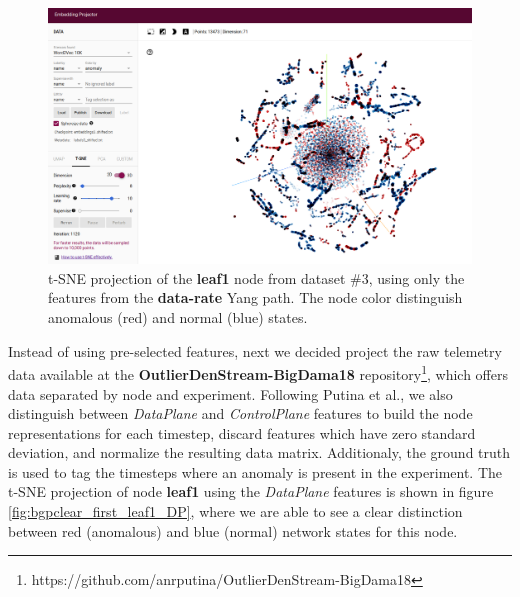 \begin{figure}[h!]
	\centering
	\includegraphics[width=0.8\linewidth]{Figure/dataset3_leaf1_data-rate.png}
	\caption{t-SNE projection of the \textbf{leaf1} node from dataset \#3, using only the features from the \textbf{data-rate} Yang path. The node color distinguish anomalous (red) and normal (blue) states.}
	\label{fig:dataset3_leaf1_data-rate}
\end{figure}

Instead of using pre-selected features, next we decided project the raw telemetry data available at the \textbf{OutlierDenStream-BigDama18} repository\footnote{https://github.com/anrputina/OutlierDenStream-BigDama18}, which offers data separated by node and experiment.
Following Putina et al., we also distinguish between \textit{DataPlane} and \textit{ControlPlane} features to build the node representations for each timestep, discard features which have zero standard deviation, and normalize the resulting data matrix.
Additionaly, the ground truth is used to tag the timesteps where an anomaly is present in the experiment.
The t-SNE projection of node \textbf{leaf1} using the \textit{DataPlane} features is shown in figure \ref{fig:bgpclear_first_leaf1_DP}, where we are able to see a clear distinction between red (anomalous) and blue (normal) network states for this node.

